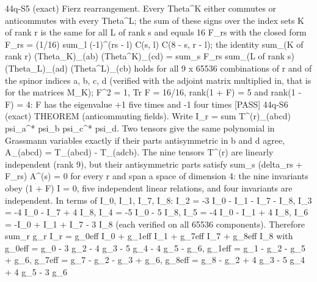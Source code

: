 \documentclass[
  10pt,
]{article}
\newenvironment{Shaded}{}{}
\newcommand{\NormalTok}[1]{#1}
\begin{document}
\begin{Shaded}
\begin{Highlighting}[]
\NormalTok{[PASS] 44q{-}S5  (exact) Fierz rearrangement. Every Theta\^{}K either commutes or anticommutes with every Theta\^{}L; the sum of these signs over the index sets K of rank r is the same for all L of rank s and equals 16 F\_rs with the closed form F\_rs = (1/16) sum\_l ({-}1)\^{}(rs {-} l) C(s, l) C(8 {-} s, r {-} l); the identity sum\_(K of rank r) (Theta\_K)\_(ab) (Theta\^{}K)\_(cd) = sum\_s F\_rs sum\_(L of rank s) (Theta\_L)\_(ad) (Theta\^{}L)\_(cb) holds for all 9 x 65536 combinations of r and of the spinor indices a, b, c, d (verified with the adjoint matrix multiplied in, that is for the matrices M\_K); F\^{}2 = 1, Tr F = 16/16, rank(1 + F) = 5 and rank(1 {-} F) = 4: F has the eigenvalue +1 five times and {-}1 four times}
\NormalTok{[PASS] 44q{-}S6  (exact) THEOREM (anticommuting fields). Write I\_r = sum T\^{}(r)\_(abcd) psi\_a\^{}* psi\_b psi\_c\^{}* psi\_d. Two tensors give the same polynomial in Grassmann variables exactly if their parts antisymmetric in b and d agree, A\_(abcd) = T\_(abcd) {-} T\_(adcb). The nine tensors T\^{}(r) are linearly independent (rank 9), but their antisymmetric parts satisfy sum\_s (delta\_rs + F\_rs) A\^{}(s) = 0 for every r and span a space of dimension 4: the nine invariants obey (1 + F) I = 0, five independent linear relations, and four invariants are independent. In terms of I\_0, I\_1, I\_7, I\_8: I\_2 = {-}3 I\_0 {-} I\_1 {-} I\_7 {-} I\_8, I\_3 = {-}4 I\_0 {-} I\_7 + 4 I\_8, I\_4 = {-}5 I\_0 {-} 5 I\_8, I\_5 = {-}4 I\_0 {-} I\_1 + 4 I\_8, I\_6 = {-}I\_0 + I\_1 + I\_7 {-} 3 I\_8 (each verified on all 65536 components). Therefore sum\_r g\_r I\_r = g\_0eff I\_0 + g\_1eff I\_1 + g\_7eff I\_7 + g\_8eff I\_8 with g\_0eff = g\_0 {-} 3 g\_2 {-} 4 g\_3 {-} 5 g\_4 {-} 4 g\_5 {-} g\_6, g\_1eff = g\_1 {-} g\_2 {-} g\_5 + g\_6, g\_7eff = g\_7 {-} g\_2 {-} g\_3 + g\_6, g\_8eff = g\_8 {-} g\_2 + 4 g\_3 {-} 5 g\_4 + 4 g\_5 {-} 3 g\_6}

\end{Highlighting}
\end{Shaded}
\end{document}
